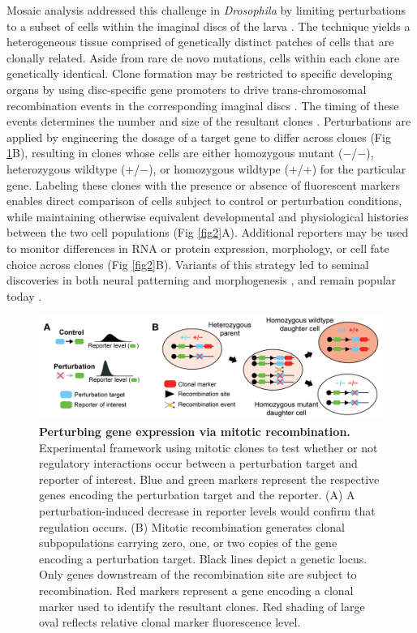 \documentclass[10pt,letterpaper]{article}
\begin{document}
Mosaic analysis addressed this challenge in \textit{Drosophila} by limiting perturbations to a subset of cells within the imaginal discs of the larva \cite{Xu1993,Xu2012}. The technique yields a heterogeneous tissue comprised of genetically distinct patches of cells that are clonally related. Aside from rare de novo mutations, cells within each clone are genetically identical. Clone formation may be restricted to specific developing organs by using disc-specific gene promoters to drive trans-chromosomal recombination events in the corresponding imaginal discs \cite{Newsome2000,Theodosiou1998}. The timing of these events determines the number and size of the resultant clones \cite{Struhl1993}. Perturbations are applied by engineering the dosage of a target gene to differ across clones (Fig \ref{fig1}B), resulting in clones whose cells are either homozygous mutant ($-$/$-$), heterozygous wildtype (+/$-$), or homozygous wildtype (+/+) for the particular gene. Labeling these clones with the presence or absence of fluorescent markers enables direct comparison of cells subject to control or perturbation conditions, while maintaining otherwise equivalent developmental and physiological histories between the two cell populations (Fig \ref{fig2}A). Additional reporters may be used to monitor differences in RNA or protein expression, morphology, or cell fate choice across clones (Fig \ref{fig2}B). Variants of this strategy led to seminal discoveries in both neural patterning \cite{Halfar2001,Tomlinson2001,Yang2001} and morphogenesis \cite{Huang2005,Thompson2006}, and remain popular today \cite{Atkins2019,Enomoto2018,Germani2018}.

\begin{figure}[!h]
\centering
\includegraphics[width=0.95\columnwidth]{./figure_1}
\caption{\textbf{Perturbing gene expression via mitotic recombination.}
Experimental framework using mitotic clones to test whether or not regulatory interactions occur between a perturbation target and reporter of interest. Blue and green markers represent the respective genes encoding the perturbation target and the reporter. (A) A perturbation-induced decrease in reporter levels would confirm that regulation occurs. (B) Mitotic recombination generates clonal subpopulations carrying zero, one, or two copies of the gene encoding a perturbation target. Black lines depict a genetic locus. Only genes downstream of the recombination site are subject to recombination. Red markers represent a gene encoding a clonal marker used to identify the resultant clones. Red shading of large oval reflects relative clonal marker fluorescence level.}
\label{fig1}
\end{figure}
\end{document}
